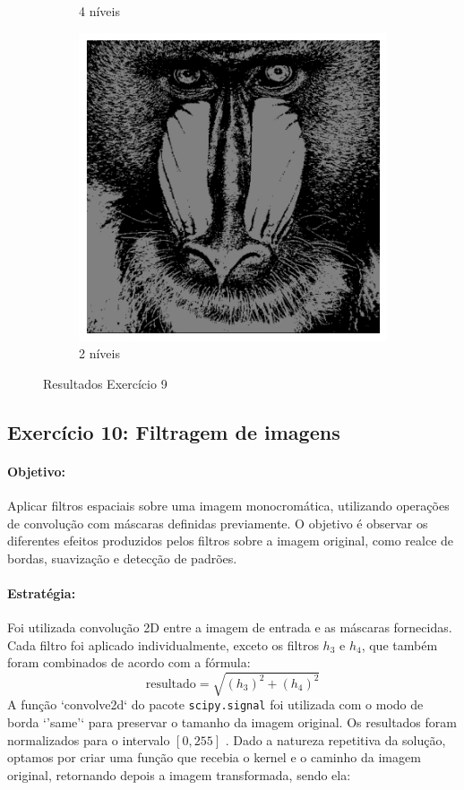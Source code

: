 \documentclass[12pt,a4paper]{report}
\begin{document}
\begin{figure}[H]
\begin{subfigure}{0.3\textwidth}
    \caption{4 níveis}
  \end{subfigure}
  \begin{subfigure}{0.3\textwidth}
    \includegraphics[width=\linewidth]{imagens/ex9-7.png}
    \caption{2 níveis}
  \end{subfigure}
  \caption{Resultados Exercício 9}
\end{figure}

\subsection{Exercício 10: Filtragem de imagens}
\paragraph{Objetivo:} 
Aplicar filtros espaciais sobre uma imagem monocromática, utilizando operações de convolução com máscaras definidas previamente. O objetivo é observar os diferentes efeitos produzidos pelos filtros sobre a imagem original, como realce de bordas, suavização e detecção de padrões.

\paragraph{Estratégia:} 
Foi utilizada convolução 2D entre a imagem de entrada e as máscaras fornecidas. Cada filtro foi aplicado individualmente, exceto os filtros $h_3$ e $h_4$, que também foram combinados de acordo com a fórmula:
\[
\text{resultado} = \sqrt{(h_3)^2 + (h_4)^2}
\]
A função `convolve2d` do pacote \texttt{scipy.signal} foi utilizada com o modo de borda `'same'` para preservar o tamanho da imagem original. Os resultados foram normalizados para o intervalo $[0, 255]$ .
Dado a natureza repetitiva da solução, optamos por criar uma função que recebia o kernel e o caminho da imagem original, retornando depois a imagem transformada, sendo ela:
\end{document}
